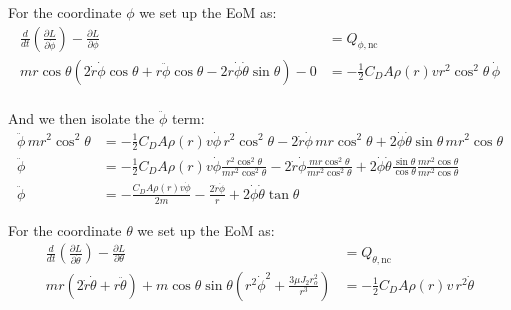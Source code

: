 \documentclass[titlepage]{article}
\begin{document}
For the coordinate $\phi$ we set up the EoM as:
\begin{equation}
	\begin{split}
		\frac{d}{dt}\left(\frac{\partial L}{\partial\dot{\phi}}\right)-\frac{\partial L}{\partial\phi}&=Q_{\phi,\text{nc}} \\
		mr\cos\theta\left(2\dot{r}\dot{\phi}\cos\theta+r\ddot{\phi}\cos\theta-2r\dot{\phi}\dot{\theta}\sin\theta\right)-0&=-\frac{1}{2}C_DA\rho(r)vr^2\cos^2\theta\,\dot{\phi} \\	
	\end{split}
\end{equation}

And we then isolate the $\ddot{\phi}$ term:
\begin{equation}
	\begin{split}
		\ddot{\phi}\,mr^2\cos^2\theta&=-\frac{1}{2}C_DA\rho(r)v\dot{\phi}\,r^2\cos^2\theta-2\dot{r}\dot{\phi}\,mr\cos^2\theta+2\dot{\phi}\dot{\theta}\sin\theta\,mr^2\cos\theta \\
		\ddot{\phi}&=-\frac{1}{2}C_DA\rho(r)v\dot{\phi}\frac{r^2\cos^2\theta}{mr^2\cos^2\theta}-2\dot{r}\dot{\phi}\frac{mr\cos^2\theta}{mr^2\cos^2\theta}+2\dot{\phi}\dot{\theta}\frac{\sin\theta}{\cos\theta}\frac{mr^2\cos\theta}{mr^2\cos\theta} \\
		\ddot{\phi}&=-\frac{C_DA\rho(r)v\dot{\phi}}{2m}-\frac{2\dot{r}\dot{\phi}}{r}+2\dot{\phi}\dot{\theta}\tan\theta
	\end{split}
\end{equation}

For the coordinate $\theta$ we set up the EoM as:
\begin{equation}
	\begin{split}
		\frac{d}{dt}\left(\frac{\partial L}{\partial\dot{\theta}}\right)-\frac{\partial L}{\partial\theta}&=Q_{\theta,\text{nc}} \\
		mr\left(2\dot{r}\dot{\theta}+r\ddot{\theta}\right)+m\cos\theta\sin\theta\left(r^2\dot{\phi}^2+\frac{3\mu J_2r_o^2}{r^3}\right)&=-\frac{1}{2}C_DA\rho(r)v\,r^2\dot{\theta} \\
	\end{split}
\end{equation}
\end{document}
